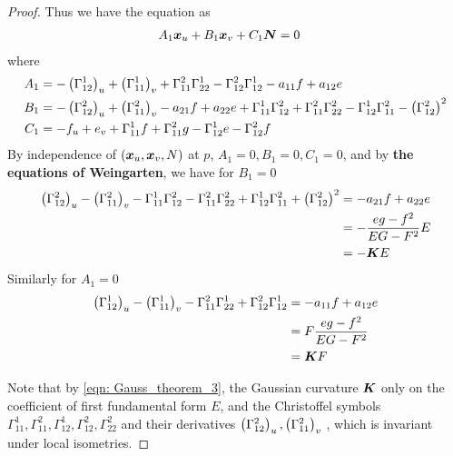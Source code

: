 \documentclass[11pt]{article}
\begin{document}
\begin{itemize}
\begin{proof}
Thus we have the equation as 
\begin{align*}
A_{1}\boldsymbol{x}_{u}+ B_{1}\boldsymbol{x}_{v}+ C_{1}\boldsymbol{N} &= 0
\end{align*}
where
\begin{align}
A_{1} &= -\left(\Gamma_{12}^{1}\right)_{u}+\left(\Gamma_{11}^{1}\right)_{v} +   \Gamma_{11}^{2}\Gamma_{22}^{1}  - \Gamma_{12}^{2}\Gamma_{12}^{1}- a_{11}f+ a_{12}e\nonumber\\
B_{1} &= -\left(\Gamma_{12}^{2}\right)_{u}+ \left(\Gamma_{11}^{2}\right)_{v} - a_{21}f + a_{22}e+ \Gamma_{11}^{1}\Gamma_{12}^{2} + \Gamma_{11}^{2}\Gamma_{22}^{2} - \Gamma_{12}^{1}\Gamma_{11}^{2} - \left(\Gamma_{12}^{2}\right)^{2}\nonumber\\
C_{1} &=  -f_{u}+e_{v}+ \Gamma_{11}^{1}f + \Gamma_{11}^{2}g   - \Gamma_{12}^{1}e - \Gamma_{12}^{2}f \nonumber
\end{align}
By independence of $(\boldsymbol{x}_{u}, \boldsymbol{x}_{v}, N)$ at $p$, $A_{1}=0, B_{1}=0, C_{1} = 0$, and by \textbf{the equations of Weingarten}, we have for $B_{1} = 0$
\begin{align}
\left(\Gamma_{12}^{2}\right)_{u}- \left(\Gamma_{11}^{2}\right)_{v} - \Gamma_{11}^{1}\Gamma_{12}^{2} - \Gamma_{11}^{2}\Gamma_{22}^{2} + \Gamma_{12}^{1}\Gamma_{11}^{2} +\left(\Gamma_{12}^{2}\right)^{2} &=- a_{21}f + a_{22}e\nonumber\\
&= -\frac{eg - f^{2}}{EG- F^{2}}E \nonumber\\
&= -\boldsymbol{K}E \label{eqn: Gauss_theorem_3}
\end{align}
Similarly for $A_{1} = 0$
\begin{align*}
\left(\Gamma_{12}^{1}\right)_{u}-\left(\Gamma_{11}^{1}\right)_{v} -   \Gamma_{11}^{2}\Gamma_{22}^{1}  + \Gamma_{12}^{2}\Gamma_{12}^{1}&= - a_{11}f+ a_{12}e\\
&= F\frac{eg - f^{2}}{EG- F^{2}}\\
&=\boldsymbol{K}F 
\end{align*}

Note that by \eqref{eqn: Gauss_theorem_3}, the Gaussian curvature $\boldsymbol{K}$ only on the coefficient of first fundamental form $E$, and the Christoffel symbols $\Gamma_{11}^{1}, \Gamma_{11}^{2},  \Gamma_{12}^{1}, \Gamma_{12}^{2}, \Gamma_{22}^{2} $ and their derivatives $\left(\Gamma_{12}^{2}\right)_{u}, \left(\Gamma_{11}^{2}\right)_{v}$ , which is invariant under local isometries. \QEDA
\end{proof}


\end{itemize}
\end{document}

